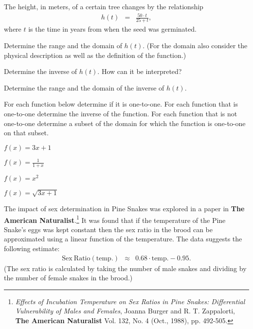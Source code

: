 \begin{problem}
\item The height, in meters, of a certain tree changes by the
  relationship
  \begin{eqnarray*}
    h(t) & = & \frac{50\cdot t}{25+t},
  \end{eqnarray*}
  where $t$ is the time in years from when the seed was germinated.
  \begin{subproblem}
    \item Determine the range and the domain of $h(t)$. (For the
      domain also consider the physical description as well as the
      definition of the function.)
      \vfill
    \item Determine the inverse of $h(t)$. How can it be interpreted?
      \vfill
    \item Determine the range and the domain of the inverse of $h(t)$.
      \vfill
  \end{subproblem}

  \clearpage

\item For each function below determine if it is one-to-one. For each
  function that is one-to-one determine the inverse of the
  function. For each function that is not one-to-one determine a
  subset of the domain for which the function is one-to-one on that
  subset. 
  \begin{subproblem}
    \item $f(x)=3x+1$
      \vfill
    \item $f(x)=\frac{1}{1+x}$
      \vfill
    \item $f(x)=x^2$
      \vfill
    \item $f(x)=\sqrt{3x+1}$
      \vfill
  \end{subproblem}

  \clearpage


\item \label{question:snakeTemps} The impact of sex determination in Pine Snakes was explored in a
  paper in \textbf{The American Naturalist}.\footnote{\textit{Effects
      of Incubation Temperature on Sex Ratios in Pine Snakes:
      Differential Vulnerability of Males and Females}, Joanna Burger
    and R. T. Zappalorti, \textbf{The American Naturalist} Vol. 132,
    No. 4 (Oct., 1988), pp. 492-505.} It was found that if the
  temperature of the Pine Snake's eggs was kept constant then the
  sex ratio in the brood can be approximated using a linear function
  of the temperature. The data suggests the following estimate:
  \begin{eqnarray*}
    \mathrm{Sex~Ratio(temp.)} & \approx & 0.68\cdot\mathrm{temp.}-0.95.
  \end{eqnarray*}
  (The sex ratio is calculated by taking the number of male snakes and
  dividing by the number of female snakes in the brood.)


\end{problem}
